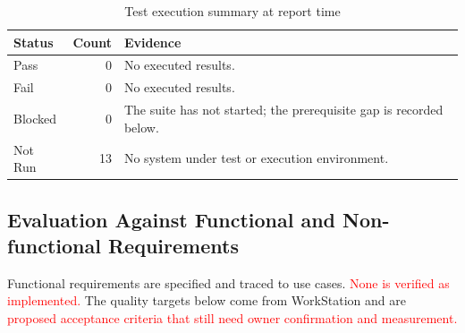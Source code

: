 \documentclass[a4paper,12pt]{article}
\newcommand{\weak}[1]{\textcolor{red}{#1}}
\begin{document}
\begin{table}[H]
\centering
\small
\begin{tabularx}{0.72\textwidth}{@{}l r X@{}}
\toprule
Status & Count & Evidence \\
\midrule
Pass & 0 & No executed results. \\
Fail & 0 & No executed results. \\
Blocked & 0 & The suite has not started; the prerequisite gap is recorded below. \\
Not Run & 13 & No system under test or execution environment. \\
\bottomrule
\end{tabularx}
\caption{Test execution summary at report time}
\label{tab:test-execution-summary}
\end{table}

\subsection{Evaluation Against Functional and Non-functional Requirements}
Functional requirements are specified and traced to use cases. \weak{None is verified as implemented.} The quality targets below come from WorkStation and are \weak{proposed acceptance criteria that still need owner confirmation and measurement.}
\end{document}
